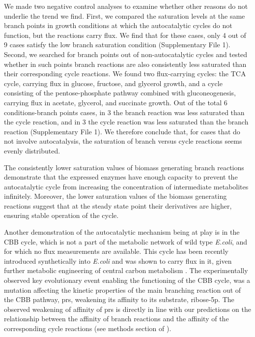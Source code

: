     We made two negative control analyses to examine whether other reasons do not underlie the trend we find.
    First, we compared the saturation levels at the same branch points in growth conditions at which the autocatalytic cycles do not function, but the reactions carry flux.
    We find that for these cases, only 4 out of 9 cases satisfy the low branch saturation condition (Supplementary File 1).
    Second, we searched for branch points out of non-autocatalytic cycles and tested whether in such points branch reactions are also consistently less saturated than their corresponding cycle reactions.
    We found two flux-carrying cycles: the TCA cycle, carrying flux in glucose, fructose, and glycerol growth, and a cycle consisting of the pentose-phosphate pathway combined with gluconeogenesis, carrying flux in acetate, glycerol, and succinate growth.
    Out of the total 6 conditions-branch points cases, in 3 the branch reaction was less saturated than the cycle reaction, and in 3 the cycle reaction was less saturated than the branch reaction (Supplementary File 1).
    We therefore conclude that, for cases that do not involve autocatalysis, the saturation of branch versus cycle reactions seems evenly distributed.


    The consistently lower saturation values of biomass generating branch reactions demonstrate that the expressed enzymes have enough capacity to prevent the autocatalytic cycle from increasing the concentration of intermediate metabolites infinitely.
    Moreover, the lower saturation values of the biomass generating reactions suggest that at the steady state point their derivatives are higher, ensuring stable operation of the cycle.

    Another demonstration of the autocatalytic mechanism being at play is in the CBB cycle, which is not a part of the metabolic network of wild type \emph{E.coli}, and for which no flux measurements are available.
    This cycle has been recently introduced synthetically into \emph{E.coli} and was shown to carry flux in it, given further metabolic engineering of central carbon metabolism \cite{Antonovsky2016-jy}.
    The experimentally observed key evolutionary event enabling the functioning of the CBB cycle, was a mutation affecting the kinetic properties of the main branching reaction out of the CBB pathway, prs, weakening its affinity to its substrate, ribose-5p.
    The observed weakening of affinity of prs is directly in line with our predictions on the relationship between the affinity of branch reactions and the affinity of the corresponding cycle reactions (see methods section of \cite{Antonovsky2016-jy}).

